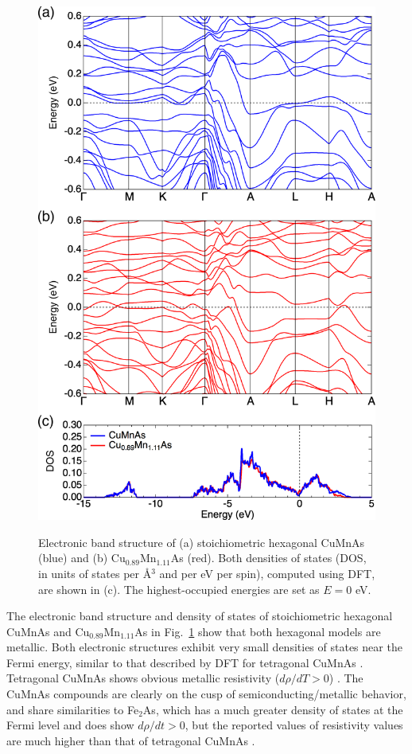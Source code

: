 \documentclass[10pt,doublespacing,edeposit]{uiucthesis2020}
\begin{document}
\begin{mainmatter}
\begin{figure}
\centering\includegraphics[width=0.7\columnwidth]{figures/ch5/h-cumnas-dft-band.png} \\
\caption{\label{fig:DFT-band}
Electronic band structure of (a) stoichiometric hexagonal CuMnAs (blue) and (b) Cu$_{0.89}$Mn$_{1.11}$As (red). Both densities of states (DOS, in units of states per \AA$^3$ and per eV per spin), computed using DFT, are shown in (c).
The highest-occupied energies are set as $E=0$ eV.
}
\end{figure}

The electronic band structure and density of states of stoichiometric hexagonal CuMnAs and Cu$_{0.89}$Mn$_{1.11}$As in Fig.\ \ref{fig:DFT-band} show that both hexagonal models are metallic.
Both electronic structures exhibit very small densities of states near the Fermi energy, similar to that described by DFT for tetragonal CuMnAs \cite{Maca2017}.
Tetragonal CuMnAs shows obvious metallic resistivity ($d\rho/dT > 0$) \cite{Wadley2013}.
The CuMnAs compounds are clearly on the cusp of semiconducting/metallic behavior, and share similarities to Fe$_2$As, which has a much greater density of states at the Fermi level and does show $d\rho/dt > 0$, but the reported values of resistivity values are much higher than that of tetragonal CuMnAs \cite{Yang2019,Takeshita2017}.



\end{mainmatter}
\end{document}
